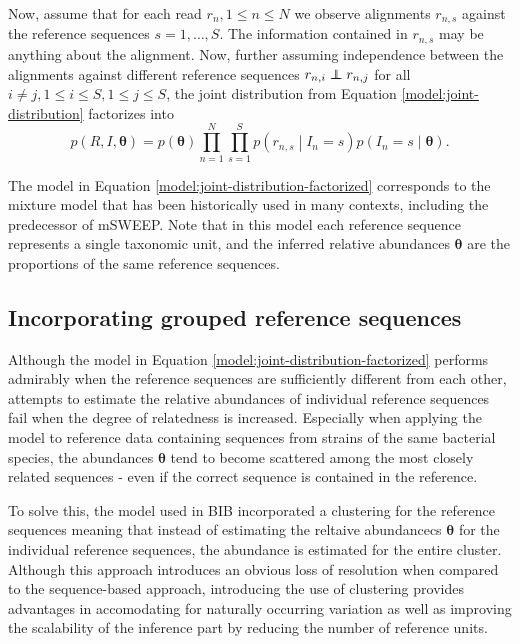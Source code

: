 \documentclass[officiallayout]{tktla}
\newcommand\indept{\protect\mathpalette{\protect\independenT}{\perp}}
\def\independenT#1#2{\mathrel{\rlap{$#1#2$}\mkern2mu{#1#2}}}
\begin{document}
Now, assume that for each read $r_{n}, 1 \leq n \leq N$ we observe
alignments $r_{n, s}$ against the reference sequences $s = 1, \dots,
S$. The information contained in $r_{n, s}$ may be anything about the
alignment. Now, further assuming independence between the alignments
against different reference sequences $r_{n, i} \indept r_{n, j}$ for
all $i \neq j, 1 \leq i \leq S, 1 \leq j \leq S$, the joint
distribution from Equation \ref{model:joint-distribution} factorizes
into
\begin{equation}
  \label{model:joint-distribution-factorized}
  p\left(R, I, \boldsymbol\theta\right) = p\left(\boldsymbol\theta\right)\prod_{n = 1}^{N} \prod_{s = 1}^{S} p\left(r_{n, s} \middle| I_{n} = s\right) p\left(I_{n} = s \middle| \boldsymbol\theta\right).
\end{equation}

The model in Equation \ref{model:joint-distribution-factorized}
corresponds to the mixture model that has been historically used in
many contexts, including the predecessor of mSWEEP. Note that in this
model each reference sequence represents a single taxonomic unit, and
the inferred relative abundances $\boldsymbol\theta$ are the
proportions of the same reference sequences.

\subsection{Incorporating grouped reference sequences}

Although the model in Equation
\ref{model:joint-distribution-factorized} performs admirably when the
reference sequences are sufficiently different from each other,
attempts to estimate the relative abundances of individual reference
sequences fail when the degree of relatedness is increased. Especially
when applying the model to reference data containing sequences from
strains of the same bacterial species, the abundances
$\boldsymbol\theta$ tend to become scattered among the most closely
related sequences - even if the correct sequence is contained in the
reference.

To solve this, the model used in BIB incorporated a clustering for the
reference sequences \textemdash meaning that instead of estimating the
reltaive abundancecs $\boldsymbol\theta$ for the individual reference
sequences, the abundance is estimated for the entire cluster. Although
this approach introduces an obvious loss of resolution when compared
to the sequence-based approach, introducing the use of clustering
provides advantages in accomodating for naturally occurring variation
as well as improving the scalability of the inference part by reducing
the number of reference units.
\end{document}
